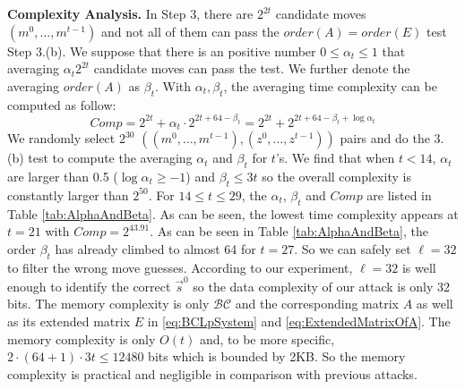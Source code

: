 \noindent\textbf{Complexity Analysis. }
In Step 3, there are $2^{2t}$ candidate moves $(m^0,\ldots, m^{t-1})$ and not all of them can pass the $order(A)=order(E)$ test Step 3.(b).
We suppose that there is an positive number $0\leq \alpha_t \leq 1$ that averaging $\alpha_t  2^{2t}$ candidate moves can pass the test.
We further denote the averaging $order(A)$ as $\beta_t $.
With $\alpha_t ,\beta_t $, the averaging time complexity can be computed as follow:
\begin{equation}\label{eq:Complexity}
  Comp=2^{2t}+\alpha_t \cdot 2^{2t+64-\beta_t }=2^{2t}+2^{2t+64-\beta_t +\log\alpha_t }
\end{equation}
We randomly select $2^{30}$ $((m^0,\ldots, m^{t-1}), (z^0,\ldots, z^{t-1}))$ pairs and do the 3.(b) test to compute the averaging $\alpha_t$ and $\beta_t$ for $t$'s.
We find that when $t<14$, $\alpha_t$ are larger than 0.5 ($\log\alpha_t\geq -1$) and $\beta_t\leq 3t$ so the overall complexity is constantly larger than $2^{50}$.
For $14\leq t\leq 29$, the $\alpha_t$, $\beta_t$ and $Comp$ are listed in Table \ref{tab:AlphaAndBeta}.
As can be seen, the lowest time complexity appears at $t=21$ with $Comp=2^{43.91}$.
As can be seen in Table \ref{tab:AlphaAndBeta}, the order $\beta_t$ has already climbed to almost 64 for $t=27$.
So we can safely set $\ell=32$ to filter the wrong move guesses.
According to our experiment, $\ell=32$ is well enough to identify the correct $\vec{s}^0$ so the data complexity of our attack is only 32 bits.
The memory complexity is only $\mathcal{BC}$ and the corresponding matrix $A$ as well as its extended matrix $E$ in \eqref{eq:BCLpSystem} and \eqref{eq:ExtendedMatrixOfA}.
The memory complexity is only $O(t)$ and, to be more specific, $2\cdot (64+1)\cdot 3t\leq 12480$ bits which is bounded by 2KB.
So the memory complexity is practical and negligible in comparison with previous attacks. 

